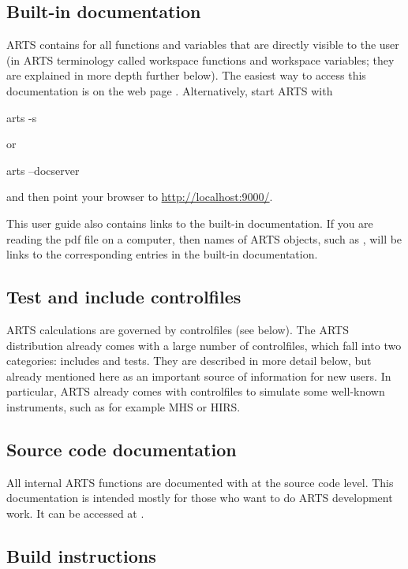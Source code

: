 \subsection{Built-in documentation}
\label{sec:built-in_doc}

ARTS contains  for all functions and
variables that are directly visible to the user (in ARTS terminology called
workspace functions and workspace variables; they are explained in more depth
further below).
The easiest way to access this documentation is on the web page
\artsdocsurl{\docserver}. Alternatively, start ARTS with
\begin{code}
  arts -s
\end{code}
or
\begin{code}
  arts --docserver
\end{code}
and then point your browser to \url{http://localhost:9000/}.

This user guide also contains links to the built-in
documentation.  If you are reading the pdf file on a computer, then
names of ARTS objects, such as , will be links to
the corresponding entries in the built-in documentation. 

\subsection{Test and include controlfiles}

ARTS calculations are governed by controlfiles (see below). The ARTS
distribution already comes with a large number of controlfiles, which fall into
two categories: includes and tests. They are described in more detail below,
but already mentioned here as an important source of information for new users.
In particular, ARTS already comes with controlfiles to simulate some well-known
instruments, such as for example MHS or HIRS. \\

\subsection{Source code documentation}

All internal ARTS functions are documented with  at the
source code level. This documentation is intended mostly for those who want to
do ARTS development work. It can be accessed at
.

\subsection{Build instructions}

